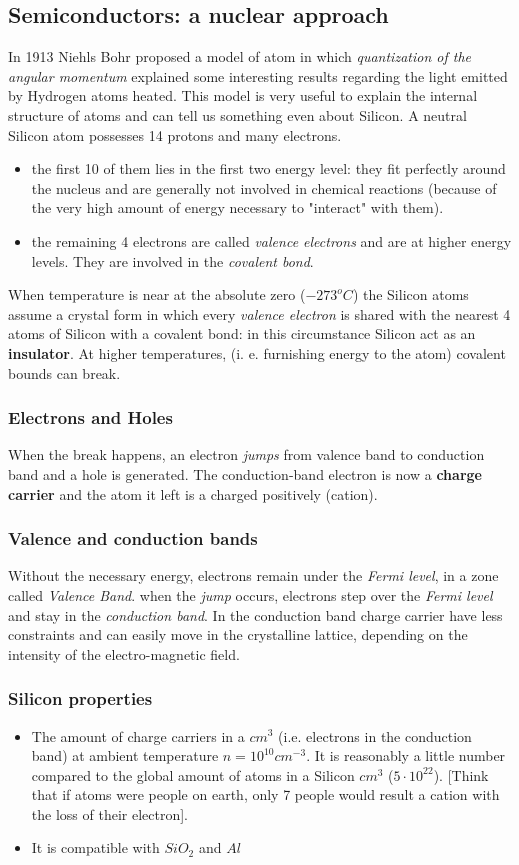 \documentclass[12pt]{article}
\newcommand{\B}{\textbf}
\newcommand{\I}{\textit}
\newcommand{\bite}{\begin{itemize}} %
\newcommand{\fite}{\end{itemize}}   %
\begin{document}
\subsection{Semiconductors: a nuclear approach}
In 1913 Niehls Bohr  proposed a model of atom in which \I{quantization of the angular momentum}  explained some interesting results regarding the light emitted by Hydrogen atoms heated. This model is very useful to explain the internal structure of atoms and can tell us something even about Silicon. A neutral Silicon atom possesses 14 protons and many electrons.
\begin{itemize}
	\item the first 10 of them lies in the first two energy level: they fit perfectly around the nucleus and  are generally not involved in chemical reactions (because of the very high amount of energy necessary to "interact" with them).
	\item the remaining 4 electrons are called \textit{valence electrons} and are at higher energy levels. They are involved in the \textit{covalent bond}.
\end{itemize}
When temperature is near at the absolute zero ($-273^o C$) the Silicon atoms assume a crystal form in which every \textit{valence electron} is shared with the nearest 4 atoms of Silicon with a covalent bond: in this circumstance Silicon act as an \textbf{insulator}.
At higher temperatures, (i. e. furnishing energy to the atom) covalent bounds can break. 
\subsubsection{Electrons and Holes}
When the break happens, an electron \I{jumps} from valence band to conduction band and a hole is generated. The conduction-band electron is now a \B{charge carrier} and the atom it left is a charged positively (cation). 
\subsubsection{Valence and conduction bands}
Without the necessary energy, electrons remain under the \I{Fermi level}, in a zone called \I{Valence Band}. when the \I{jump} occurs, electrons step over the \I{Fermi level} and stay in the \I{conduction band}. In the conduction band charge carrier have less constraints and can easily move in the crystalline lattice, depending on the intensity of the electro-magnetic field.
\subsubsection{Silicon properties}
\bite
	\item The amount of charge carriers in a $cm^3$ (i.e. electrons in the conduction band) at ambient temperature $n = 10^{10} cm^{-3}$. It is reasonably a little number compared to the global amount of atoms in a Silicon $cm^3$ ($5 \cdot 10^{22}$). [Think that if atoms were people on earth, only 7 people would result a cation with the loss of their electron]. 
	\item It is compatible with $SiO_2$ and $Al$
\fite
\end{document}
